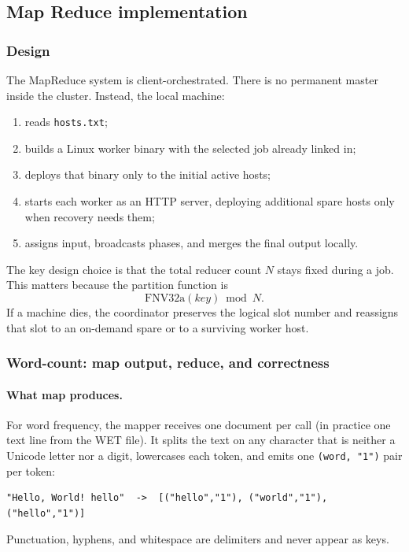 \documentclass[11pt,a4paper]{article}
\begin{document}
\subsection{Map Reduce implementation}

\subsubsection{Design}

The MapReduce system is client-orchestrated. There is no permanent master
inside the cluster. Instead, the local machine:

\begin{enumerate}[leftmargin=1.5em]
  \item reads \texttt{hosts.txt};
  \item builds a Linux worker binary with the selected job already linked in;
  \item deploys that binary only to the initial active hosts;
  \item starts each worker as an HTTP server, deploying additional spare hosts
  only when recovery needs them;
  \item assigns input, broadcasts phases, and merges the final output locally.
\end{enumerate}

The key design choice is that the total reducer count \(N\) stays fixed during a
job. This matters because the partition function is
\[
\mathrm{FNV32a}(key) \bmod N.
\]
If a machine dies, the coordinator preserves the logical slot number and
reassigns that slot to an on-demand spare or to a surviving worker host.

\subsubsection{Word-count: map output, reduce, and correctness}

\paragraph{What map produces.}
For word frequency, the mapper receives one document per call (in practice one
text line from the WET file). It splits the text on any character that is
neither a Unicode letter nor a digit, lowercases each token, and emits one
\texttt{(word, "1")} pair per token:
\begin{lstlisting}[style=codeblock]
"Hello, World! hello"  ->  [("hello","1"), ("world","1"), ("hello","1")]
\end{lstlisting}
Punctuation, hyphens, and whitespace are delimiters and never appear as keys.
\end{document}
